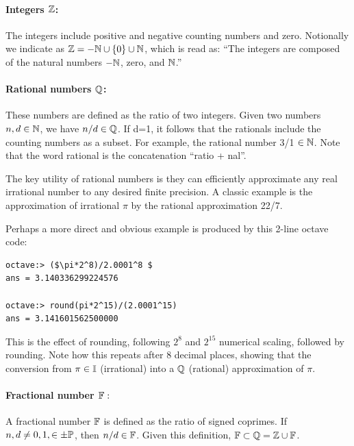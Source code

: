 \documentclass{ximera}
\begin{document}
\paragraph{Integers $\Z$: \label{page:bbZ} }
The integers include positive and negative counting numbers and zero.  Notionally we indicate as
{$\Z = -\N \cup \{0\} \cup \N$}, which is read as:
 ``The integers are composed of the natural numbers $-\N$, zero, and $\N$.'' 
 

\paragraph{Rational numbers $\Q$: \label{page:bbQ} }
These numbers are defined as the ratio of two integers.  Given two numbers $n, d \in \N$,
we have $n/d \in \Q$.  If d=1, it follows that the rationals include the counting numbers as a subset. 
For example, the rational number 3/1 $\in \N$. 
Note that the word rational is the concatenation ``ratio + nal''.

The key utility of rational numbers is they can efficiently approximate any real irrational number to any desired finite precision.
A classic example is the approximation of irrational $\pi$ by the rational approximation 22/7.

Perhaps a more direct and obvious example is produced by this 2-line octave code:
\begin{center}
\begin{verbatim}
octave:> ($\pi*2^8)/2.0001^8 $
ans = 3.140336299224576

octave:> round(pi*2^15)/(2.0001^15)
ans = 3.141601562500000
\end{verbatim}
\end{center}
This is the effect of rounding, following $2^8$ and $2^{15}$ numerical scaling, followed by rounding.
Note how this repeats after 8 decimal places, showing that the conversion from $\pi\in\I$ (irrational)
into a $\Q$ (rational) approximation of $\pi$.

 

\paragraph{Fractional number $\F:$ \label{page:bbF} }
A fractional number $\F$ is defined as the ratio of signed coprimes. If $n, d \ne 0, 1, \in \pm\P$, then $n/d \in\F$.
Given this definition, $\F\subset\Q = \Z \cup \F$. 
\end{document}
